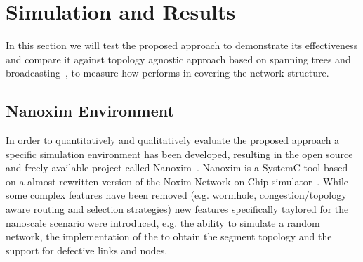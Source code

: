 
\section{Simulation and Results}
\label{sec:simulation}

In this section we will test the proposed \disr{} approach to demonstrate
its effectiveness and compare it against topology agnostic approach
based on spanning trees and
broadcasting~\cite{Patwardhan05evaluatingthe}, to measure how \disr{}
performs in covering the network structure.


\subsection{Nanoxim Environment}

In order to quantitatively and qualitatively evaluate the proposed approach a
specific simulation environment has been developed, resulting in
the open source and freely available project called
Nanoxim~\cite{nanoxim}.
Nanoxim is a SystemC tool based on a almost rewritten
version of the Noxim Network-on-Chip simulator~\cite{noxim}. While some
complex features have been removed (e.g. wormhole, congestion/topology
aware routing and selection strategies) new features specifically
taylored for the nanoscale scenario were introduced, e.g. the ability to simulate a random
network, the implementation of the \disr{} to obtain the segment topology
and the support for defective links and nodes.

